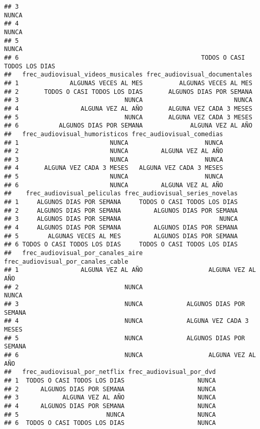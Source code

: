 \documentclass[
]{article}
\begin{document}
\begin{verbatim}
## 3                                                                        NUNCA
## 4                                                                        NUNCA
## 5                                                                        NUNCA
## 6                                                  TODOS O CASI TODOS LOS DIAS
##   frec_audiovisual_videos_musicales frec_audiovisual_documentales
## 1              ALGUNAS VECES AL MES          ALGUNAS VECES AL MES
## 2       TODOS O CASI TODOS LOS DIAS       ALGUNOS DIAS POR SEMANA
## 3                             NUNCA                         NUNCA
## 4                 ALGUNA VEZ AL AÑO       ALGUNA VEZ CADA 3 MESES
## 5                             NUNCA       ALGUNA VEZ CADA 3 MESES
## 6           ALGUNOS DIAS POR SEMANA             ALGUNA VEZ AL AÑO
##   frec_audiovisual_humoristicos frec_audiovisual_comedias
## 1                         NUNCA                     NUNCA
## 2                         NUNCA         ALGUNA VEZ AL AÑO
## 3                         NUNCA                     NUNCA
## 4       ALGUNA VEZ CADA 3 MESES   ALGUNA VEZ CADA 3 MESES
## 5                         NUNCA                     NUNCA
## 6                         NUNCA         ALGUNA VEZ AL AÑO
##    frec_audiovisual_peliculas frec_audiovisual_series_novelas
## 1     ALGUNOS DIAS POR SEMANA     TODOS O CASI TODOS LOS DIAS
## 2     ALGUNOS DIAS POR SEMANA         ALGUNOS DIAS POR SEMANA
## 3     ALGUNOS DIAS POR SEMANA                           NUNCA
## 4     ALGUNOS DIAS POR SEMANA         ALGUNOS DIAS POR SEMANA
## 5        ALGUNAS VECES AL MES         ALGUNOS DIAS POR SEMANA
## 6 TODOS O CASI TODOS LOS DIAS     TODOS O CASI TODOS LOS DIAS
##   frec_audiovisual_por_canales_aire frec_audiovisual_por_canales_cable
## 1                 ALGUNA VEZ AL AÑO                  ALGUNA VEZ AL AÑO
## 2                             NUNCA                              NUNCA
## 3                             NUNCA            ALGUNOS DIAS POR SEMANA
## 4                             NUNCA            ALGUNA VEZ CADA 3 MESES
## 5                             NUNCA            ALGUNOS DIAS POR SEMANA
## 6                             NUNCA                  ALGUNA VEZ AL AÑO
##   frec_audiovisual_por_netflix frec_audiovisual_por_dvd
## 1  TODOS O CASI TODOS LOS DIAS                    NUNCA
## 2      ALGUNOS DIAS POR SEMANA                    NUNCA
## 3            ALGUNA VEZ AL AÑO                    NUNCA
## 4      ALGUNOS DIAS POR SEMANA                    NUNCA
## 5                        NUNCA                    NUNCA
## 6  TODOS O CASI TODOS LOS DIAS                    NUNCA

\end{verbatim}
\end{document}
